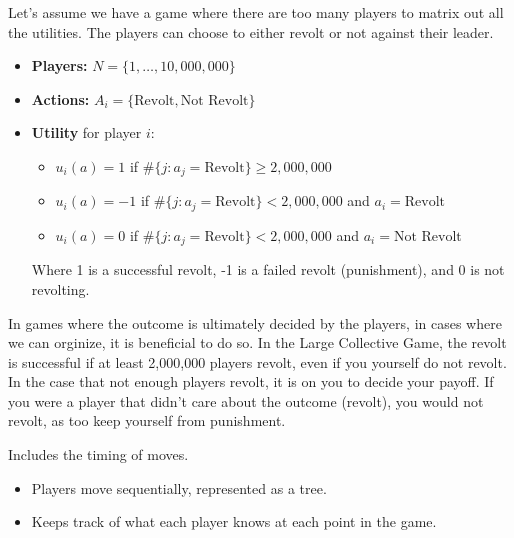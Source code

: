 \documentclass{article}
\begin{document}
\begin{example}
  Let's assume we have a game where there are too many players
  to matrix out all the utilities.
  The players can choose to either revolt or not against their leader.
  \begin{itemize}
    \item \textbf{Players:} $N = \{ 1, \ldots, 10,000,000\}$
    \item \textbf{Actions:} $A_i = \{ \text{Revolt}, \text{Not Revolt}\}$
    \item \textbf{Utility} for player $i$:
    \begin{itemize}[label=$\bullet$]
      \item $u_i(a) = 1$ if $\#\{ j : a_j = \text{Revolt}\} \geq 2,000,000$
      \item $u_i(a) = -1$ if $\#\{ j : a_j = \text{Revolt}\} < 2,000,000$ and $a_i = \text{Revolt}$
      \item $u_i(a) = 0$ if $\#\{ j : a_j = \text{Revolt}\} < 2,000,000$ and $a_i = \text{Not Revolt}$
    \end{itemize}
    Where 1 is a successful revolt, -1 is a failed revolt (punishment), and 0 is not revolting.
  \end{itemize}
\end{example}
In games where the outcome is ultimately decided by the players,
in cases where we can orginize, it is beneficial to do so.
In the Large Collective Game, the revolt is successful if at least 2,000,000 players revolt,
even if you yourself do not revolt.
In the case that not enough players revolt, it is on you to decide your payoff.
If you were a player that didn't care about the outcome (revolt), you would not revolt, as too keep yourself from punishment.

\begin{definition}
  Includes the timing of moves.
  \begin{itemize}
    \item Players move sequentially, represented as a tree.
    \item Keeps track of what each player knows at each point in the game.
  \end{itemize}
\end{definition}
\end{document}
